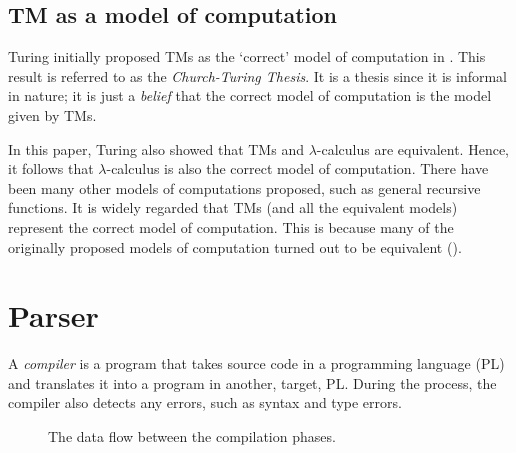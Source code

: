 \subsection{TM as a model of computation}
Turing initially proposed TMs as the `correct' model of computation in \cite{turing1936computable}. This result is referred to as the \emph{Church-Turing Thesis}. It is a thesis since it is informal in nature; it is just a \textit{belief} that the correct model of computation is the model given by TMs. 

In this paper, Turing also showed that TMs and $\lambda$-calculus are equivalent. Hence, it follows that $\lambda$-calculus is also the correct model of computation. There have been many other models of computations proposed, such as general recursive functions. It is widely regarded that TMs (and all the equivalent models) represent the correct model of computation. This is because many of the originally proposed models of computation turned out to be equivalent (\cite{copeland2004essential}).

\section{Parser}
A \emph{compiler} is a program that takes source code in a programming language (PL) and translates it into a program in another, target, PL. During the process, the compiler also detects any errors, such as syntax and type errors. 

\begin{figure}[htb]
    \centering
    \caption{The data flow between the compilation phases.}
    \label{fig:compilation_process}
\end{figure}

